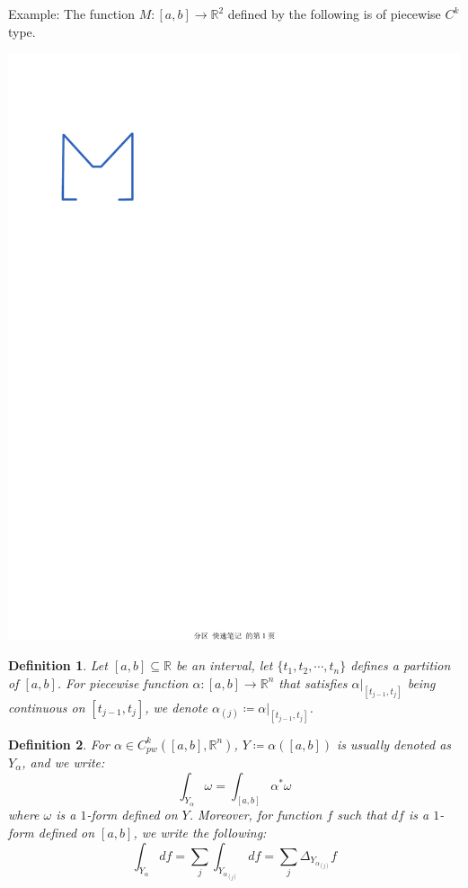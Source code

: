 \documentclass[15pt]{book}
\theoremstyle{break}
\theoremstyle{break}
\newtheorem{defn}{Definition}[corL]
\newcommand{\R}{\mathbb{R}}
\newcommand{\example}{\color{green}Example: \color{black}}
\begin{document}
\example The function $M:[a,b]\to \R^2$ defined by the following is of piecewise $C^k$ type. 
\begin{center}
\includegraphics[scale=0.5]{M.pdf}
\end{center}

\begin{defn}
Let $[a,b]\subseteq \R$ be an interval, let $\{t_1,t_2,\cdots, t_n\}$ defines a partition of $[a,b]$. For piecewise function $\alpha:[a,b]\to \R^n$ that satisfies $\alpha|_{[t_{j-1},t_j]}$ being continuous on  $[t_{j-1},t_j]$, we denote $\alpha_{(j)} \coloneqq \alpha|_{[t_{j-1},t_j]}$.
\end{defn}

\begin{defn}
For $\alpha \in C_{pw}^k([a,b],\R^n)$, $Y \coloneqq \alpha([a,b])$ is usually denoted as $Y_{\alpha}$, and we write:
$$\int_{Y_{\alpha}} \omega = \int_{[a,b]} \alpha^*\omega$$
where $\omega $ is a $1$-form defined on $Y$. Moreover, for function $f$ such that $df$ is a $1$-form defined on $[a,b]$, we write the following:
$$\int_{Y_\alpha} df = \sum_j \int_{Y_{\alpha_{(j)}}}df = \sum_j \Delta_{Y_{\alpha_{(j)}}} f$$  
\end{defn}
\end{document}
